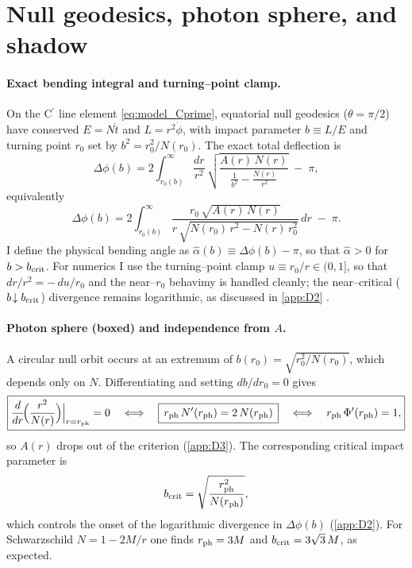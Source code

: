 \documentclass{iopjournal}
\begin{document}
\section{Null geodesics, photon sphere, and shadow}\label{sec:geodesics}
\paragraph{Exact bending integral and turning–point clamp.}
On the C$^\prime$ line element \eqref{eq:model_Cprime}, equatorial null geodesics ($\theta=\pi/2$) have conserved $E=N\dot t$ and $L=r^{2}\dot\phi$, with impact parameter $b\equiv L/E$ and turning point $r_0$ set by $b^2=r_0^2/N(r_0)$. The exact total deflection is
\begin{equation}
\Delta\phi(b)
=2\int_{r_0(b)}^\infty \frac{dr}{r^2}\,
\sqrt{\frac{A(r)\,N(r)}{\displaystyle \frac{1}{b^2}-\frac{N(r)}{r^2}}}\;-\;\pi,
\label{eq:8_deflection}
\end{equation}
equivalently
\begin{equation}
\Delta\phi(b)
=2\int_{r_0(b)}^\infty
\frac{r_0\,\sqrt{A(r)\,N(r)}}{r\,\sqrt{N(r_0)\,r^2-N(r)\,r_0^2}}\,dr\;-\;\pi.
\label{eq:8_deflection_alt}
\end{equation}
I define the physical bending angle as $\hat\alpha(b)\equiv\Delta\phi(b)-\pi$, so that $\hat\alpha>0$ for $b>b_{\rm crit}$. For numerics I use the turning–point clamp $u\equiv r_0/r\in(0,1]$, so that $dr/r^2=-\,du/r_0$ and the near–$r_0$ behavimy is handled cleanly; the near–critical ($b\!\downarrow b_{\rm crit}$) divergence remains logarithmic, as discussed in \cref{app:D2} \cite{Bozza2002PRD,Perlick2004LRR}.

\paragraph{Photon sphere (boxed) and independence from $A$.}
A circular null orbit occurs at an extremum of $b(r_0)=\sqrt{r_0^2/N(r_0)}$, which depends only on $N$. Differentiating and setting $db/dr_0=0$ gives
\begin{equation}
\boxed{\frac{d}{dr}\!\Big(\frac{r^2}{N(r)}\Big)\Big|_{r=r_{\rm ph}}=0
\quad\Longleftrightarrow\quad
\boxed{\,r_{\rm ph}\,N'(r_{\rm ph})=2\,N(r_{\rm ph})\,}
\quad\Longleftrightarrow\quad
r_{\rm ph}\,\Phi'(r_{\rm ph})=1,}
\label{eq:8_ph_crit}
\end{equation}
so $A(r)$ drops out of the criterion (\cref{app:D3}). The corresponding critical impact parameter is
\begin{equation}
b_{\rm crit}=\sqrt{\frac{r_{\rm ph}^{2}}{N(r_{\rm ph})}},
\label{eq:8_bcrit}
\end{equation}
which controls the onset of the logarithmic divergence in $\Delta\phi(b)$ (\cref{app:D2}). For Schwarzschild $N=1-2M/r$ one finds $r_{\rm ph}=3M$ and $b_{\rm crit}=3\sqrt{3}\,M$, as expected.
\end{document}
